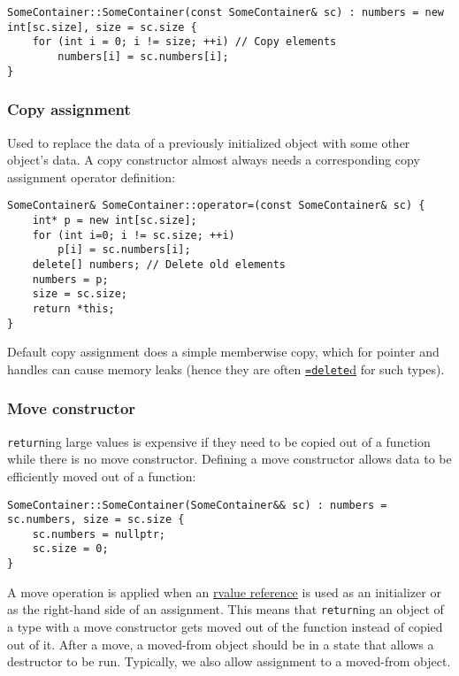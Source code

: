 \documentclass[8pt, table, xcdraw]{article}%
\begin{document}
\begin{lstlisting}
SomeContainer::SomeContainer(const SomeContainer& sc) : numbers = new int[sc.size], size = sc.size {
    for (int i = 0; i != size; ++i) // Copy elements
        numbers[i] = sc.numbers[i];
}
\end{lstlisting}

\subsubsection{Copy assignment}

Used to replace the data of a previously initialized object with some other object's data. A copy constructor almost always needs a corresponding copy assignment operator definition:

\begin{lstlisting}
SomeContainer& SomeContainer::operator=(const SomeContainer& sc) {
    int* p = new int[sc.size];
    for (int i=0; i != sc.size; ++i)
        p[i] = sc.numbers[i];
    delete[] numbers; // Delete old elements
    numbers = p;
    size = sc.size;
    return *this;
}
\end{lstlisting}

Default copy assignment does a simple memberwise copy, which for pointer and handles can cause memory leaks (hence they are often \hyperref[isdelete]{\lstinline{=delete}d} for such types).

\subsubsection{Move constructor} \label{moveconstructor}

\lstinline{return}ing large values is expensive if they need to be copied out of a function while there is no move constructor. Defining a move constructor allows data to be efficiently moved out of a function:

\begin{lstlisting}
SomeContainer::SomeContainer(SomeContainer&& sc) : numbers = sc.numbers, size = sc.size {
    sc.numbers = nullptr;
    sc.size = 0;
}
\end{lstlisting}

A move operation is applied when an \hyperref[rvaluereference]{rvalue reference} is used as an initializer or as the right-hand side of an assignment. This means that \lstinline{return}ing an object of a type with a move constructor gets moved out of the function instead of copied out of it. After a move, a moved-from object should be in a state that allows a destructor to be run.  Typically, we also allow assignment to a moved-from object.
\end{document}
